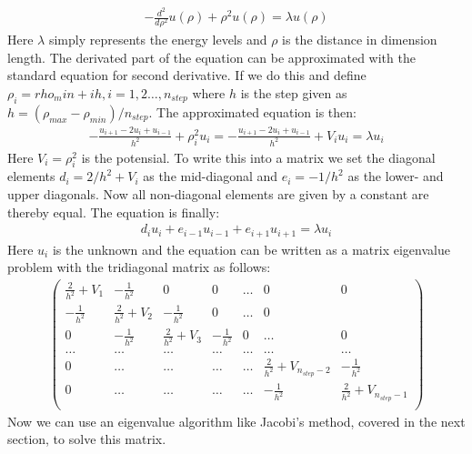 \documentclass[11pt, a4 paper]{report}
\newenvironment{tabbed}{\begin{addmargin}{0.1cm}}{\end{addmargin}}
\newcommand{\vsp}{\vspace{0.2cm}}
\begin{document}
\begin{tabbed}
            \begin{align*}
                -\frac{d^2}{d\rho^2}u(\rho) + \rho^2u(\rho) = \lambda u(\rho)
            \end{align*}
            Here $\lambda$ simply represents the energy levels and $\rho$ is the distance in dimension length. The derivated part of the equation can be approximated with the standard equation for second derivative. If we do this and define $\rho_i=rho_min + ih, i=1,2\dots,n_{step}$ where $h$ is the step given as $h=(\rho_{max}-\rho_{min})/n_{step}$. The approximated equation is then:
            \begin{align*}
                -\frac{u_{i+1}-2u_i+u_{i-1}}{h^2} + \rho^2_i u_i = -\frac{u_{i+1}-2u_i+u_{i-1}}{h^2} + V_iu_i = \lambda u_i
            \end{align*}
            Here $V_i=\rho^2_i$ is the potensial. To write this into a matrix we set the diagonal elements $d_i=2/h^2 + V_i$ as the mid-diagonal and $e_i=-1/h^2$ as the lower- and upper diagonals. Now all non-diagonal elements are given by a constant are thereby equal. The equation is finally:
            \begin{align*}
                d_iu_i + e_{i-1}u_{i-1} + e_{i+1}u_{i+1} = \lambda u_i
            \end{align*}
            Here $u_i$ is the unknown and the equation can be written as a matrix eigenvalue problem with the tridiagonal matrix as follows:
            \begin{align*}
                \begin{pmatrix}
                    \frac{2}{h^2}+V_1 & -\frac{1}{h^2} & 0 & 0 & \dots & 0 & 0\\
                    -\frac{1}{h^2} & \frac{2}{h^2}+V_2 & -\frac{1}{h^2} & 0 & \dots & 0\\
                    0 & -\frac{1}{h^2} & \frac{2}{h^2}+V_3 & -\frac{1}{h^2} & 0 & \dots & 0\\
                    \dots & \dots & \dots & \dots & \dots & \dots & \dots\\
                    0 & \dots & \dots & \dots & \dots & \frac{2}{h^2}+V_{n_{step}-2} & -\frac{1}{h^2}\\
                    0 & \dots & \dots & \dots & \dots & -\frac{1}{h^2} & \frac{2}{h^2}+V_{n_{step}-1}\\
                \end{pmatrix}
            \end{align*}
            Now we can use an eigenvalue algorithm like Jacobi's method, covered in the next section, to solve this matrix.
        \end{tabbed}\vsp
\end{document}
